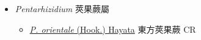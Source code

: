 
  \begin{itemize}
 \item[] \textit{Pentarhizidium} 莢果蕨屬
                    
  \begin{itemize}
        \item[] \href{http://www.theplantlist.org/tpl1.1/search?q=Pentarhizidium+orientale}{\textit{P. orientale} (Hook.) Hayata}     東方莢果蕨 CR
  \end{itemize}
  \end{itemize}
